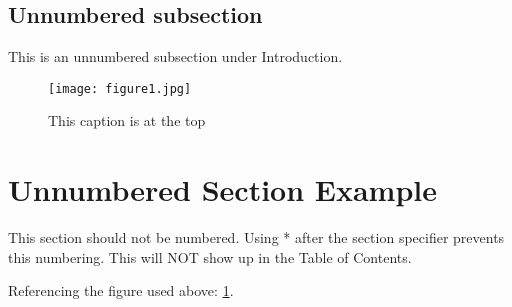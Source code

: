 \documentclass[14pt, a4paper]{article} %
\begin{document}
\pagebreak 

\subsection*{Unnumbered subsection}
This is an unnumbered subsection under Introduction. 
\begin{figure}[h]
	\centering
	\caption{This caption is at the top}
	\texttt{[image: figure1.jpg]}
	\label{fig:1}
\end{figure}


\section*{Unnumbered Section Example}
This section should not be numbered. Using * after the section specifier prevents this numbering. This will NOT show up in the Table of Contents. 

Referencing the figure used above: \ref{fig:1}.
\end{document}
